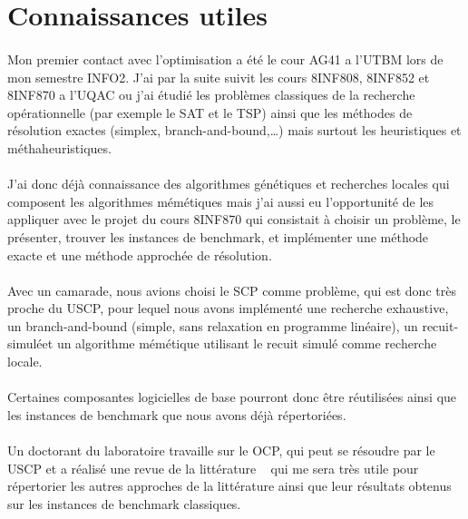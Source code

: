 \documentclass[a4paper,11pt,twoside,french,report]{../common/simplem}
\begin{document}
		\section{Connaissances utiles}
			\paragraph*{}
				Mon premier contact avec l'optimisation a été le cour \gls{AG41} a l'\gls{UTBM} lors de mon semestre INFO2. J'ai par la suite suivit les cours \gls{8INF808}, \gls{8INF852} et \gls{8INF870} a l'\gls{UQAC} ou j'ai étudié les problèmes classiques de la recherche opérationnelle (par exemple le \gls{SAT} et le \gls{TSP}) ainsi que les méthodes de résolution exactes (simplex, branch-and-bound,\ldots) mais surtout les heuristiques et méthaheuristiques.
			\paragraph*{}
				J'ai donc déjà connaissance des algorithmes génétiques et recherches locales qui composent les algorithmes mémétiques mais j'ai aussi eu l'opportunité de les appliquer avec le projet du cours \gls{8INF870} qui consistait à choisir un problème, le présenter, trouver les instances de benchmark, et implémenter une méthode exacte et une méthode approchée de résolution.
			\paragraph*{}
				Avec un camarade, nous avions choisi le \gls{SCP} comme problème, qui est donc très proche du \gls{USCP}, pour lequel nous avons implémenté une recherche exhaustive, un branch-and-bound (simple, sans relaxation en programme linéaire), un recuit-simuléet un algorithme mémétique utilisant le recuit simulé comme recherche locale.~\cite{pinam452019}
			\paragraph*{}
				Certaines composantes logicielles de base pourront donc être réutilisées ainsi que les instances de benchmark que nous avons déjà répertoriées.
			\paragraph*{}
				Un doctorant du laboratoire travaille sur le \gls{OCP}, qui peut se résoudre par le \gls{USCP} et a réalisé une revue de la littérature ~\cite{Kritter2019} qui me sera très utile pour répertorier les autres approches de la littérature ainsi que leur résultats obtenus sur les instances de benchmark classiques.
\end{document}

